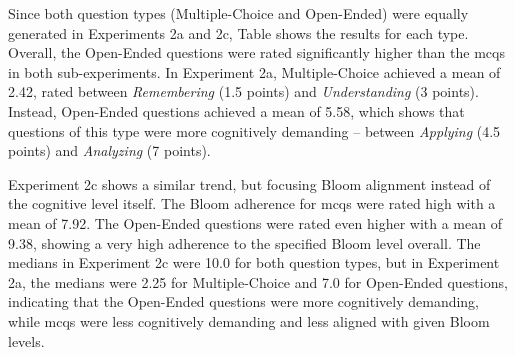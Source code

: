 Since both question types (Multiple-Choice and Open-Ended) were equally generated in Experiments 2a and 2c, Table  shows the results for each type. Overall, the Open-Ended questions were rated significantly higher than the \acp{mcq} in both sub-experiments. In Experiment 2a, Multiple-Choice achieved a mean of 2.42, rated between \textit{Remembering} (1.5 points) and \textit{Understanding} (3 points). Instead, Open-Ended questions achieved a mean of 5.58, which shows that questions of this type were more cognitively demanding -- between \textit{Applying} (4.5 points) and \textit{Analyzing} (7 points).

\pagebreak

Experiment 2c shows a similar trend, but focusing Bloom alignment instead of the cognitive level itself. The Bloom adherence for \acp{mcq} were rated high with a mean of 7.92. The Open-Ended questions were rated even higher with a mean of 9.38, showing a very high adherence to the specified Bloom level overall. The medians in Experiment 2c were 10.0 for both question types, but in Experiment 2a, the medians were 2.25 for Multiple-Choice and 7.0 for Open-Ended questions, indicating that the Open-Ended questions were more cognitively demanding, while \acp{mcq} were less cognitively demanding and less aligned with given Bloom levels. 

\begin{table}[htbp]
    \centering
    \caption[Student-based Bloom Scores by Question Format and each Sub-Experiment (Exp2).]{Student-based Bloom Scores by Question Format and each Sub-Experiment (Exp2).}
    \label{tab:exp2-questiontype-experiment-bloomslevel}
\end{table}

